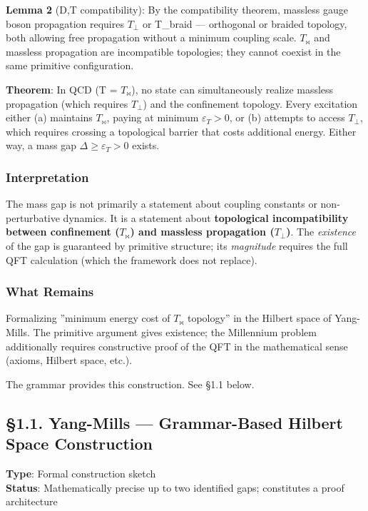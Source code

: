 \documentclass[12pt,a4paper]{article}
\newcommand{\pilcrow}{\S}
\begin{document}
\textbf{Lemma 2} (D,T compatibility): By the compatibility theorem, massless gauge boson propagation requires $T_{\perp}$ or T\_braid --- orthogonal or braided topology, both allowing free propagation without a minimum coupling scale. $T_{\bowtie}$ and massless propagation are incompatible topologies; they cannot coexist in the same primitive configuration.

\textbf{Theorem}: In QCD (T = $T_{\bowtie}$), no state can simultaneously realize massless propagation (which requires $T_{\perp}$) and the confinement topology. Every excitation either (a) maintains $T_{\bowtie}$, paying at minimum $\varepsilon_T > 0$, or (b) attempts to access $T_{\perp}$, which requires crossing a topological barrier that costs additional energy. Either way, a mass gap $\Delta \ge \varepsilon_T > 0$ exists.

\subsubsection{Interpretation}

The mass gap is not primarily a statement about coupling constants or non-perturbative dynamics. It is a statement about \textbf{topological incompatibility between confinement ($T_{\bowtie}$) and massless propagation ($T_{\perp}$)}. The \emph{existence} of the gap is guaranteed by primitive structure; its \emph{magnitude} requires the full QFT calculation (which the framework does not replace).

\subsubsection{What Remains}

Formalizing ''minimum energy cost of $T_{\bowtie}$ topology'' in the Hilbert space of Yang-Mills. The primitive argument gives existence; the Millennium problem additionally requires constructive proof of the QFT in the mathematical sense (axioms, Hilbert space, etc.).

The grammar provides this construction. See \pilcrow{}1.1 below.

\subsection{\pilcrow{}1.1. Yang-Mills --- Grammar-Based Hilbert Space Construction}

\textbf{Type}: Formal construction sketch   \\
\textbf{Status}: Mathematically precise up to two identified gaps; constitutes a proof architecture
\end{document}
